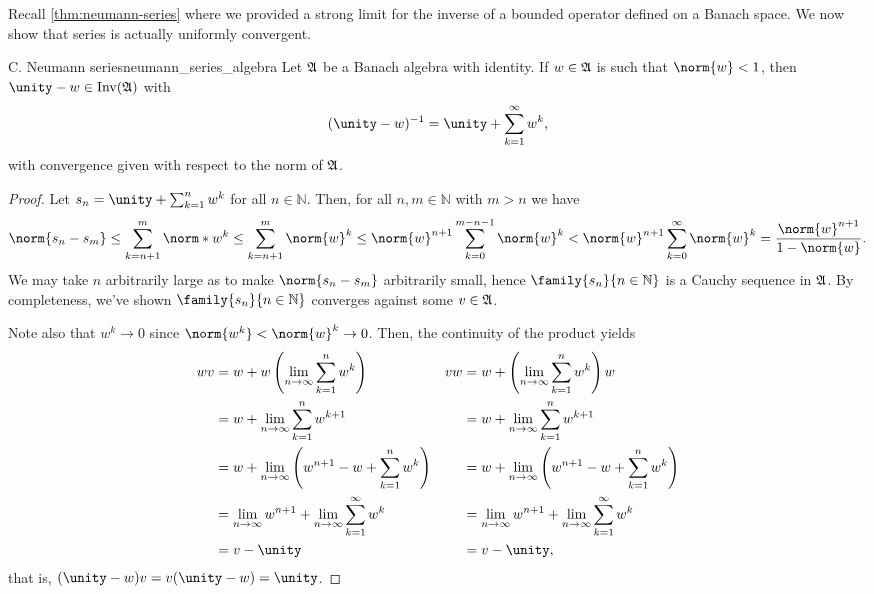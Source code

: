 Recall \cref{thm:neumann-series} where we provided a strong limit for the inverse of a bounded operator defined on a Banach space. We now show that series is actually uniformly convergent.
\begin{theorem}{C. Neumann series}{neumann_series_algebra}
    Let \(\mathfrak{A}\) be a Banach algebra with identity. If \(w \in \mathfrak{A}\) is such that \(\norm{w} < 1\), then \(\unity - w \in \invertible{\algebra{A}}\) with
    \begin{equation*}
        (\unity - w)^{-1} = \unity + \sum_{k=1}^\infty w^k,
    \end{equation*}
    with convergence given with respect to the norm of \(\mathfrak{A}\).
\end{theorem}
\begin{proof}
    Let \(s_n = \unity + \sum_{k=1}^n w^k\) for all \(n \in \mathbb{N}\).  Then, for all \(n, m \in \mathbb{N}\) with \(m > n\) we have
    \begin{equation*}
        \norm{s_n - s_m} \leq \sum_{k=n+1}^m \norm*{w^k}
        \leq \sum_{k = n+1}^m \norm{w}^k
        \leq \norm{w}^{n+1} \sum_{k=0}^{m-n-1} \norm{w}^k
        < \norm{w}^{n+1} \sum_{k=0}^{\infty} \norm{w}^k = \frac{\norm{w}^{n+1}}{1 - \norm{w}}.
    \end{equation*}
    We may take \(n\) arbitrarily large as to make \(\norm{s_n - s_m}\) arbitrarily small, hence \(\family{s_n}{n\in \mathbb{N}}\) is a Cauchy sequence in \(\mathfrak{A}\). By completeness, we've shown \(\family{s_n}{n\in \mathbb{N}}\) converges against some  \(v \in \mathfrak{A}\).

    Note also that \(w^k \to 0\) since \(\norm{w^k} < \norm{w}^k \to 0\). Then, the continuity of the product yields
    \begin{align*}
        wv &= w + w\left(\lim_{n\to \infty} \sum_{k=1}^n w^k\right)&
        vw &= w + \left(\lim_{n\to \infty} \sum_{k=1}^n w^k\right)w\\
           &= w + \lim_{n\to\infty} \sum_{k=1}^n w^{k+1}&
           &= w + \lim_{n\to\infty} \sum_{k=1}^n w^{k+1}\\
           &= w + \lim_{n \to \infty} \left(w^{n+1} - w + \sum_{k = 1}^n w^k\right)&
           &= w + \lim_{n \to \infty} \left(w^{n+1} - w + \sum_{k = 1}^n w^k\right)\\
           &= \lim_{n \to \infty} w^{n+1} + \lim_{n\to \infty} \sum_{k=1}^\infty w^k&
           &= \lim_{n \to \infty} w^{n+1} + \lim_{n\to \infty} \sum_{k=1}^\infty w^k\\
           &= v - \unity&
           &= v - \unity,
    \end{align*}
    that is, \( (\unity-w)v = v(\unity- w) =\unity\).
\end{proof}


